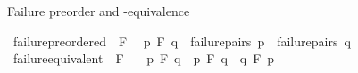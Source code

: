 \begin{isabellebody}
\begin{isamarkuptext}%
Failure preorder and -equivalence%
\end{isamarkuptext}\isamarkuptrue%
\isamarkupfalse%
\ failure{\isacharunderscore}{\kern0pt}preordered\ {\isacharparenleft}{\kern0pt}\ {\isacartoucheopen}{\isasymlesssim}F{\isacartoucheclose}\ {}{}{\isacharparenright}{\kern0pt}\ \isanewline
{\isacartoucheopen}p\ {\isasymlesssim}F\ q\ {\isasymequiv}\ failure{\isacharunderscore}{\kern0pt}pairs\ p\ {\isasymsubseteq}\ failure{\isacharunderscore}{\kern0pt}pairs\ q{\isacartoucheclose}\isanewline
\isanewline
{}\isamarkupfalse%
\ failure{\isacharunderscore}{\kern0pt}equivalent\ {\isacharparenleft}{\kern0pt}\ {\isacartoucheopen}{\isasymsimeq}F{\isacartoucheclose}\ {}{}{\isacharparenright}{\kern0pt}\ \isanewline
{\isacartoucheopen}\ p\ {\isasymsimeq}F\ q\ {\isasymequiv}\ p\ {\isasymlesssim}F\ q\ {\isasymand}\ q\ {\isasymlesssim}F\ p{\isacartoucheclose}\isanewline
{}\isamarkupfalse%
\isanewline
%
\isadelimtheory
%
\endisadelimtheory
%
\isatagtheory
{}\isamarkupfalse%
%
\endisatagtheory
{\isafoldtheory}%
%
\isadelimtheory
%
\endisadelimtheory
%
\end{isabellebody}%
\endinput
